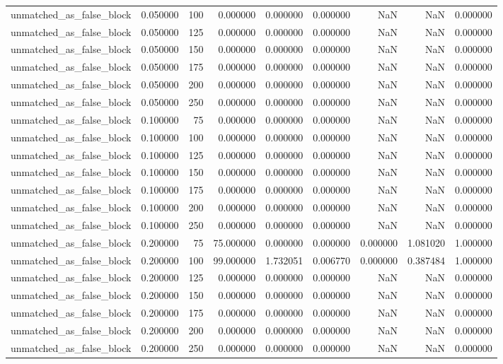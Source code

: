 \begin{tabular}{lrrrrrrrr}
unmatched_as_false_block & 0.050000 & 100 & 0.000000 & 0.000000 & 0.000000 & NaN & NaN & 0.000000 \\
unmatched_as_false_block & 0.050000 & 125 & 0.000000 & 0.000000 & 0.000000 & NaN & NaN & 0.000000 \\
unmatched_as_false_block & 0.050000 & 150 & 0.000000 & 0.000000 & 0.000000 & NaN & NaN & 0.000000 \\
unmatched_as_false_block & 0.050000 & 175 & 0.000000 & 0.000000 & 0.000000 & NaN & NaN & 0.000000 \\
unmatched_as_false_block & 0.050000 & 200 & 0.000000 & 0.000000 & 0.000000 & NaN & NaN & 0.000000 \\
unmatched_as_false_block & 0.050000 & 250 & 0.000000 & 0.000000 & 0.000000 & NaN & NaN & 0.000000 \\
unmatched_as_false_block & 0.100000 & 75 & 0.000000 & 0.000000 & 0.000000 & NaN & NaN & 0.000000 \\
unmatched_as_false_block & 0.100000 & 100 & 0.000000 & 0.000000 & 0.000000 & NaN & NaN & 0.000000 \\
unmatched_as_false_block & 0.100000 & 125 & 0.000000 & 0.000000 & 0.000000 & NaN & NaN & 0.000000 \\
unmatched_as_false_block & 0.100000 & 150 & 0.000000 & 0.000000 & 0.000000 & NaN & NaN & 0.000000 \\
unmatched_as_false_block & 0.100000 & 175 & 0.000000 & 0.000000 & 0.000000 & NaN & NaN & 0.000000 \\
unmatched_as_false_block & 0.100000 & 200 & 0.000000 & 0.000000 & 0.000000 & NaN & NaN & 0.000000 \\
unmatched_as_false_block & 0.100000 & 250 & 0.000000 & 0.000000 & 0.000000 & NaN & NaN & 0.000000 \\
unmatched_as_false_block & 0.200000 & 75 & 75.000000 & 0.000000 & 0.000000 & 0.000000 & 1.081020 & 1.000000 \\
unmatched_as_false_block & 0.200000 & 100 & 99.000000 & 1.732051 & 0.006770 & 0.000000 & 0.387484 & 1.000000 \\
unmatched_as_false_block & 0.200000 & 125 & 0.000000 & 0.000000 & 0.000000 & NaN & NaN & 0.000000 \\
unmatched_as_false_block & 0.200000 & 150 & 0.000000 & 0.000000 & 0.000000 & NaN & NaN & 0.000000 \\
unmatched_as_false_block & 0.200000 & 175 & 0.000000 & 0.000000 & 0.000000 & NaN & NaN & 0.000000 \\
unmatched_as_false_block & 0.200000 & 200 & 0.000000 & 0.000000 & 0.000000 & NaN & NaN & 0.000000 \\
unmatched_as_false_block & 0.200000 & 250 & 0.000000 & 0.000000 & 0.000000 & NaN & NaN & 0.000000 \\
\bottomrule
\end{tabular}
